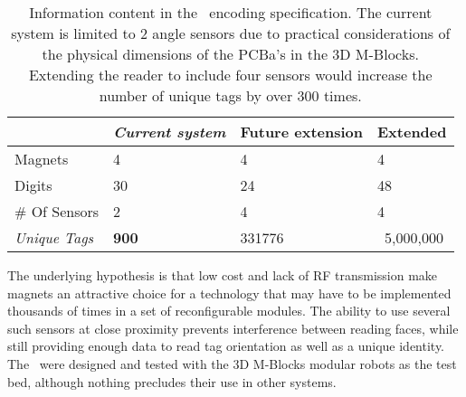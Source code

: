 \begin{table}[b]
	\caption{Information content in the \TagNamePlural~encoding specification. The current system is limited to 2 angle sensors due to practical considerations of the physical dimensions of the  PCBa's in the 3D M-Blocks. Extending the reader to include  four sensors would increase the number of unique tags by over 300 times.}
	
	\begin{tabular}{ p{1.6cm}  p{1.8cm}  p{1.9cm}  p{1.5cm}}
		\hline
								& \textit{Current system} & Future extension & Extended \\
		\hline
				\addlinespace[1ex]
		Magnets  				& 4 			 &	4				&	4	\\
		Digits 					& 30 			 &	24				&	48	\\
		\# Of Sensors 			& 2 			 &	4				&	4	\\
		\textit{Unique Tags} 	& \textbf{900} 	 & 331776			& 	~5,000,000\\
		
	\end{tabular}
	
	\label{tab:hardwareOverview}
\end{table}

The underlying hypothesis is that low cost and lack of RF transmission make magnets an attractive choice for a technology that may have to be implemented thousands of times in a set of reconfigurable modules. The ability to use several such sensors at close proximity prevents interference between reading faces, while still providing enough data to read tag orientation as well as a unique identity. The \tagNamePlural~were designed and tested with the 3D M-Blocks modular robots as the test bed, although nothing precludes their use in other systems.

